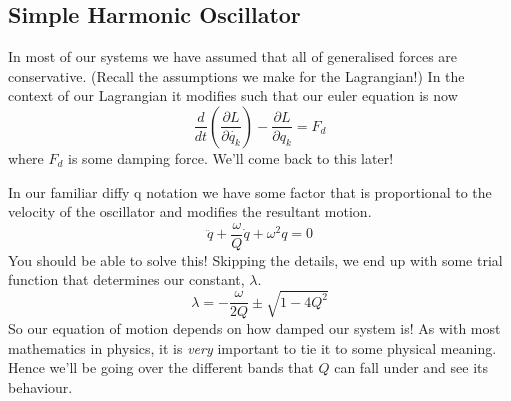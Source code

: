 \subsection{Simple Harmonic Oscillator}
In most of our systems we have assumed that all of generalised forces are conservative. (Recall the assumptions we make for the Lagrangian!) In the context of our Lagrangian it modifies such that our euler equation is now
\begin{equation}
 \frac{d}{dt} (\frac{\partial L}{\partial \dot{q_{k}}}) - \frac{\partial L}{\partial q_{k}} = F_{d}
\end{equation}
where $F_{d}$ is some damping force. We'll come back to this later! \par In our familiar diffy q notation we have some factor that is proportional to the velocity of the oscillator and modifies the resultant motion. 
\begin{equation}
\ddot{q} + \frac{\omega}{Q}\dot{q} + \omega^{2}q = 0
\end{equation}
You should be able to solve this! Skipping the details, we end up with some trial function that determines our constant, $\lambda$. 
\begin{equation}
\lambda = -\frac{\omega}{2Q} \pm \sqrt{1-4Q^{2}}
\end{equation}
So our equation of motion depends on how damped our system is! As with most mathematics in physics, it is \textit{very} important to tie it to some physical meaning. Hence we'll be going over the different bands that $Q$ can fall under and see its behaviour.

